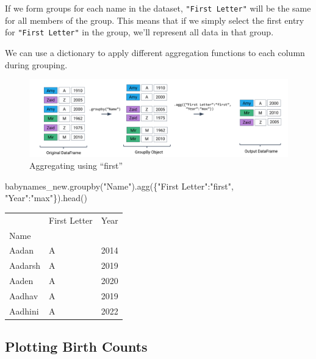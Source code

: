 \documentclass[
  letterpaper,
  DIV=11,
  numbers=noendperiod]{scrreprt}
\newenvironment{Shaded}{\begin{snugshade}}{\end{snugshade}}
\newcommand{\NormalTok}[1]{\textcolor[rgb]{0.00,0.23,0.31}{#1}}
\newcommand{\StringTok}[1]{\textcolor[rgb]{0.13,0.47,0.30}{#1}}
\begin{document}
If we form groups for each name in the dataset, \texttt{"First\ Letter"}
will be the same for all members of the group. This means that if we
simply select the first entry for \texttt{"First\ Letter"} in the group,
we'll represent all data in that group.

We can use a dictionary to apply different aggregation functions to each
column during grouping.

\begin{figure}[H]

{\centering \includegraphics{pandas_3/images/first.png}

}

\caption{Aggregating using ``first''}

\end{figure}%

\begin{Shaded}
\begin{Highlighting}[]
\NormalTok{babynames\_new.groupby(}\StringTok{"Name"}\NormalTok{).agg(\{}\StringTok{"First Letter"}\NormalTok{:}\StringTok{"first"}\NormalTok{, }\StringTok{"Year"}\NormalTok{:}\StringTok{"max"}\NormalTok{\}).head()}
\end{Highlighting}
\end{Shaded}

\begin{longtable}[]{@{}lll@{}}
\toprule\noalign{}
& First Letter & Year \\
Name & & \\
\midrule\noalign{}
\endhead
\bottomrule\noalign{}
\endlastfoot
Aadan & A & 2014 \\
Aadarsh & A & 2019 \\
Aaden & A & 2020 \\
Aadhav & A & 2019 \\
Aadhini & A & 2022 \\
\end{longtable}

\subsection{Plotting Birth Counts}\label{plotting-birth-counts}
\end{document}
